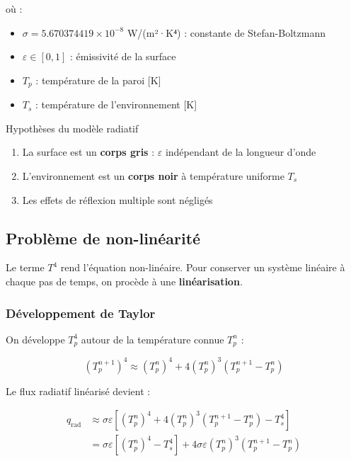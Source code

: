\documentclass[11pt,a4paper]{article}
\begin{document}
où :
\begin{itemize}
    \item $\sigma = 5.670374419 \times 10^{-8}$ W/(m²·K⁴) : constante de Stefan-Boltzmann
    \item $\varepsilon \in [0,1]$ : émissivité de la surface
    \item $T_p$ : température de la paroi [K]
    \item $T_s$ : température de l'environnement [K]
\end{itemize}

\begin{hypothese}{Hypothèses du modèle radiatif}{}
\begin{enumerate}
    \item La surface est un \textbf{corps gris} : $\varepsilon$ indépendant de la longueur d'onde
    \item L'environnement est un \textbf{corps noir} à température uniforme $T_s$
    \item Les effets de réflexion multiple sont négligés
\end{enumerate}
\end{hypothese}

\subsection{Problème de non-linéarité}

Le terme $T^4$ rend l'équation non-linéaire. Pour conserver un système linéaire à chaque pas de temps, on procède à une \textbf{linéarisation}.

\subsubsection{Développement de Taylor}

On développe $T_p^4$ autour de la température connue $T_p^n$ :

\begin{equation}
(T_p^{n+1})^4 \approx (T_p^n)^4 + 4(T_p^n)^3 (T_p^{n+1} - T_p^n)
\end{equation}

Le flux radiatif linéarisé devient :

\begin{align}
q_{\text{rad}} &\approx \sigma \varepsilon \left[ (T_p^n)^4 + 4(T_p^n)^3 (T_p^{n+1} - T_p^n) - T_s^4 \right] \\
&= \sigma \varepsilon \left[ (T_p^n)^4 - T_s^4 \right] + 4\sigma\varepsilon (T_p^n)^3 (T_p^{n+1} - T_p^n)
\end{align}
\end{document}
